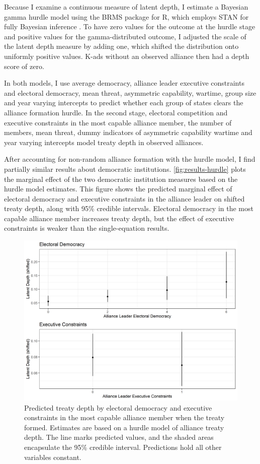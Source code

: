 \documentclass[12pt]{article}
\begin{document}
Because I examine a continuous measure of latent depth, I estimate a Bayesian gamma hurdle model using the BRMS package for \textsf{R}, which employs STAN for fully Bayesian inference \citep{Buerkner2017}.
To have zero values for the outcome at the hurdle stage and positive values for the gamma-distributed outcome, I adjusted the scale of the latent depth measure by adding one, which shifted the distribution onto uniformly positive values. 
K-ads without an observed alliance then had a depth score of zero. 


In both models, I use average democracy, alliance leader executive constraints and electoral democracy, mean threat, asymmetric capability, wartime, group size and year varying intercepts to predict whether each group of states clears the alliance formation hurdle.
In the second stage, electoral competition and executive constraints in the most capable alliance member, the number of members, mean threat, dummy indicators of asymmetric capability wartime and year varying intercepts model treaty depth in observed alliances. 


After accounting for non-random alliance formation with the hurdle model, I find partially similar results about democratic institutions. 
\autoref{fig:results-hurdle} plots the marginal effect of the two democratic institution measures based on the hurdle model estimates. 
This figure shows the predicted marginal effect of electoral democracy and executive constraints in the alliance leader on shifted treaty depth, along with 95\% credible intervals.
Electoral democracy in the most capable alliance member increases treaty depth, but the effect of executive constraints is weaker than the single-equation results.  


\begin{figure}
\includegraphics[width=.95\textwidth]{../figures/results-hurdle.png}  
\caption{Predicted treaty depth by electoral democracy and executive constraints in the most capable alliance member when the treaty formed. Estimates are based on a hurdle model of alliance treaty depth. The line marks predicted values, and the shaded areas encapsulate the 95\% credible interval. Predictions hold all other variables constant.}
\label{fig:results-hurdle}
\end{figure}
\end{document}
